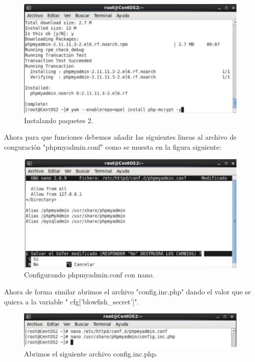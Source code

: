 \begin{figure}[H]
\begin{center}
\includegraphics[scale=0.4]{Imagenes/pregunta16-2.eps}
\caption{Instalando paquetes 2.}
\end{center}
\end{figure}


Ahora para que funciones debemos añadir las siguientes lineas al archivo de conguración "phpmyadmin.conf" como se muesta en la figura siguiente:

\begin{figure}[H]
\begin{center}
\includegraphics[scale=0.4]{Imagenes/pregunta16-3.eps}
\caption{Configurando phpmyadmin.conf con nano.}
\end{center}
\end{figure}

Ahora de forma similar abrimos el archivo "config.inc.php" dando el valor que se quiera a la variable " cfg['blowfish\_secret']".

\begin{figure}[H]
\begin{center}
\includegraphics[scale=0.4]{Imagenes/pregunta16-4.eps}
\caption{Abrimos el siguiente archivo config.inc.php.}
\end{center}
\end{figure}

